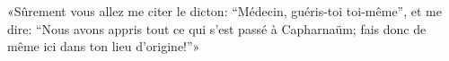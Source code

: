 \encetemps \jesuspharisiens
	«Sûrement vous allez me citer le dicton: “Médecin, guéris-toi toi-même”,
	et me dire: “Nous avons appris tout ce qui s’est passé à Capharnaüm;
	fais donc de même ici dans ton lieu d’origine!”»
